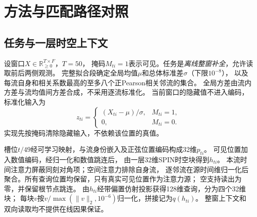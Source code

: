 \section{方法与匹配路径对照}
\label{sec:method}

\subsection{任务与一层时空上下文}
设窗口$X\in\mathbb R_{\geq0}^{T\times F}$，$T=50$，
掩码$M_{ti}=1$表示可见。任务是\emph{离线整窗补全}，允许读取前后两侧观测。
完整拟合段确定全局均值$\mu$和总体标准差$\sigma$（下限$10^{-8}$），
以及每流自身和相关系数最高的至多八个正Pearson相关邻流的集合。
全局方差由流内方差与流均值间方差合成，不采用逐流标准化。
当前窗口的隐藏值不进入编码，标准化输入为
\begin{equation}
 z_{ti}=\begin{cases}(X_{ti}-\mu)/\sigma,&M_{ti}=1,\\0,&M_{ti}=0.\end{cases}
 \label{eq:observed-input}
\end{equation}
实现先按掩码清除隐藏输入，不依赖该位置的真值。

槽位$t/49$经可学习映射，与流身份嵌入及正弦位置编码构成32维$p_{ti}$。
可见位置加入数值编码，经归一化和数值跳连后，
由一层32维SPIN时空块得到$h_{ti}$\cite{marisca2022spin}。
本流时间注意力屏蔽同刻对角项；空间注意力排除自身流，
逐邻流在源时间维归一化后聚合。所有查询位置均保留，只有真实可见位置作为注意力源；
空支持读出为零，并保留根节点跳连。
由$h_{ti}$经带偏置仿射投影获得128维查询，分为四个32维块；
每块$v$按$v/\max(\|v\|_2,10^{-6})$归一化，拼接记为$q(h_{ti})$。
整窗上下文和双向读取均不提供在线因果保证。

